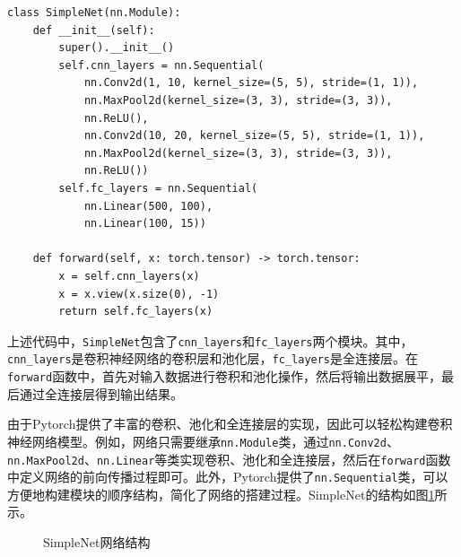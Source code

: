 \begin{lstlisting}[style=Python]
class SimpleNet(nn.Module):
    def __init__(self):
        super().__init__()
        self.cnn_layers = nn.Sequential(
            nn.Conv2d(1, 10, kernel_size=(5, 5), stride=(1, 1)),
            nn.MaxPool2d(kernel_size=(3, 3), stride=(3, 3)),
            nn.ReLU(),
            nn.Conv2d(10, 20, kernel_size=(5, 5), stride=(1, 1)),
            nn.MaxPool2d(kernel_size=(3, 3), stride=(3, 3)),
            nn.ReLU())
        self.fc_layers = nn.Sequential(
            nn.Linear(500, 100),
            nn.Linear(100, 15))

    def forward(self, x: torch.tensor) -> torch.tensor:
        x = self.cnn_layers(x)
        x = x.view(x.size(0), -1)
        return self.fc_layers(x)
\end{lstlisting}

上述代码中，\texttt{SimpleNet}包含了\texttt{cnn\_layers}和\texttt{fc\_layers}两个模块。其中，\texttt{cnn\_layers}是卷积神经网络的卷积层和池化层，\texttt{fc\_layers}是全连接层。在\texttt{forward}函数中，首先对输入数据进行卷积和池化操作，然后将输出数据展平，最后通过全连接层得到输出结果。

由于Pytorch提供了丰富的卷积、池化和全连接层的实现，因此可以轻松构建卷积神经网络模型。例如，网络只需要继承\texttt{nn.Module}类，通过\texttt{nn.Conv2d}、\texttt{nn.MaxPool2d}、\texttt{nn.Linear}等类实现卷积、池化和全连接层，然后在\texttt{forward}函数中定义网络的前向传播过程即可。此外，Pytorch提供了\texttt{nn.Sequential}类，可以方便地构建模块的顺序结构，简化了网络的搭建过程。SimpleNet的结构如图\ref{fig:simplenet}所示。

\begin{figure}[H]
    \centering
    \caption{SimpleNet网络结构}
    \label{fig:simplenet}
\end{figure}


